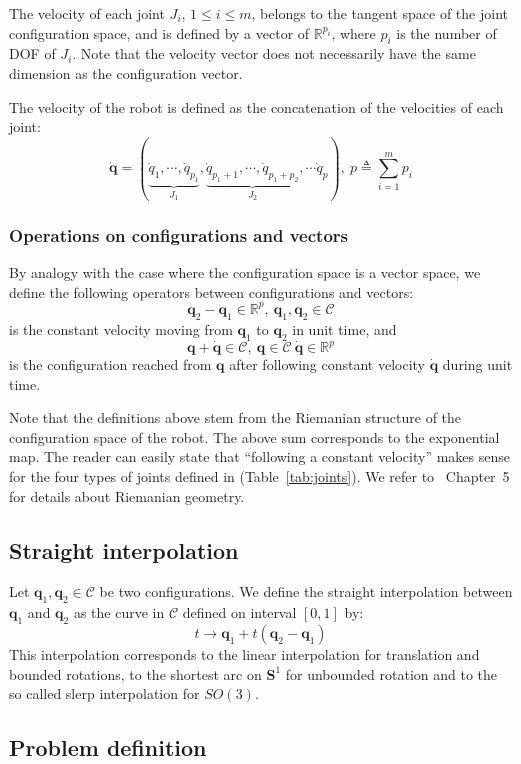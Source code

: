 \documentclass{tADR2e}
\newcommand\real{\mathbb{R}}
\newcommand\CS{\mathcal{C}}
\newcommand\Sone{\mathbf{S}^1}
\newcommand\conf{\mathbf{q}}
\begin{document}
The velocity of each joint $J_i$, $1\leq i \leq m$,  belongs to the tangent space of 
the joint configuration space, and is defined by a vector of $\real^{p_i}$, where 
$p_i$ is the number of DOF of $J_i$. Note that
the velocity vector does not necessarily have the same dimension as the 
configuration vector.

The velocity of the robot is defined as the concatenation of the velocities of 
each joint:
$$\dot{\conf} = (\underbrace{\dot{q}_{1},\cdots,\dot{q}_{p_1}}_{J_1},
\underbrace{\dot{q}_{p_1+1},\cdots,\dot{q}_{p_1+p_2}}_{J_2},\cdots \dot{q}_p),\ p
\triangleq\sum_{i=1}^m p_i$$

\subsubsection{Operations on configurations and vectors}%
By analogy with the case 
where the configuration space is a vector space, we define the following 
operators between configurations and vectors:
$$
\conf_2 - \conf_1 \in \real^p, \ \conf_1, \conf_2\in\CS
$$
is the constant velocity moving from $\conf_1$ to $\conf_2$ in unit time, and
$$
\conf + \dot{\conf}\in\CS, \ \conf\in\CS \ \dot{\conf}\in\real^p
$$
is the configuration reached from $\conf$ after following constant velocity $
\dot{\conf}$ during unit time.

Note that the definitions above stem from the Riemanian structure of the 
configuration space of the robot. The above sum corresponds to the exponential 
map. The reader can easily state that ``following a 
constant velocity'' makes sense for the four types of joints defined in 
(Table~\ref{tab:joints}). We refer to~\cite{riemanian-optim2008} Chapter~5 for 
details about Riemanian geometry.

\subsection {Straight interpolation}

Let $\conf_1, \conf_2\in\CS$ be two configurations. We define the straight 
interpolation between $\conf_1$ and $\conf_2$ as the curve in $\CS$ defined on 
interval $[0,1]$ by:
$$
t \rightarrow \conf_1 + t (\conf_2 - \conf_1)
$$
This interpolation corresponds to the linear interpolation for translation and 
bounded rotations, to the shortest arc on $\Sone$ for unbounded rotation and to 
the so called slerp interpolation for $SO(3)$.

\subsection{Problem definition}
\end{document}
